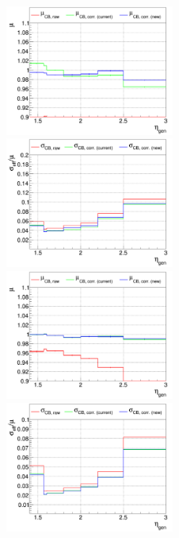 \begin{figure}
\includegraphics[width=0.495\textwidth]{./plots_pdf/ECAL_plots/plotsPU/EE/FULL/pdf/GENETA/EEFULL_GENETA_0005_0020_MuOverBins.pdf}
\includegraphics[width=0.495\textwidth]{./plots_pdf/ECAL_plots/plotsPU/EE/FULL/pdf/GENETA/EEFULL_GENETA_0005_0020_EffSigmaOverBins.pdf}
\includegraphics[width=0.495\textwidth]{./plots_pdf/ECAL_plots/plotsPU/EE/FULL/pdf/GENETA/EEFULL_GENETA_0020_0100_MuOverBins.pdf}
\includegraphics[width=0.495\textwidth]{./plots_pdf/ECAL_plots/plotsPU/EE/FULL/pdf/GENETA/EEFULL_GENETA_0020_0100_EffSigmaOverBins.pdf}

\end{figure}
